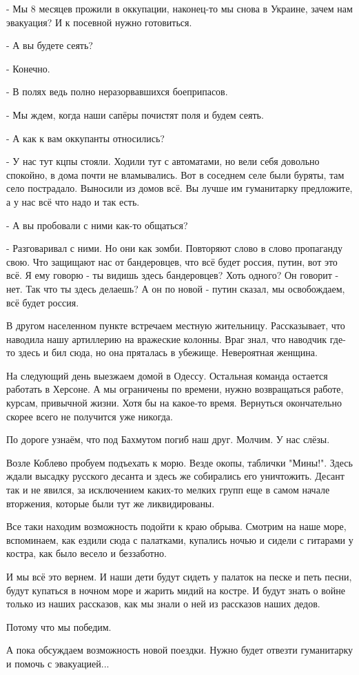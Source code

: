 - Мы 8 месяцев прожили в оккупации, наконец-то мы снова в Украине, зачем нам
эвакуация? И к посевной нужно готовиться.

- А вы будете сеять?

- Конечно.

- В полях ведь полно неразорвавшихся боеприпасов.

- Мы ждем, когда наши сапёры почистят поля и будем сеять.

- А как к вам оккупанты относились?

- У нас тут кцпы стояли. Ходили тут с автоматами, но вели себя довольно
спокойно, в дома почти не вламывались. Вот в соседнем селе были буряты, там
село пострадало. Выносили из домов всё. Вы лучше им гуманитарку предложите, а у
нас всё что надо и так есть.

- А вы пробовали с ними как-то общаться?

- Разговаривал с ними. Но они как зомби. Повторяют слово в слово пропаганду
свою. Что защищают нас от бандеровцев, что всё будет россия, путин, вот это
всё. Я ему говорю - ты видишь здесь бандеровцев? Хоть одного? Он говорит - нет.
Так что ты здесь делаешь? А он по новой - путин сказал, мы освобождаем, всё
будет россия.

В другом населенном пункте встречаем местную жительницу. Рассказывает, что
наводила нашу артиллерию на вражеские колонны. Враг знал, что наводчик где-то
здесь и бил сюда, но она пряталась в убежище. Невероятная женщина.

На следующий день выезжаем домой в Одессу. Остальная команда остается работать
в Херсоне. А мы ограничены по времени, нужно возвращаться работе, курсам,
привычной жизни. Хотя бы на какое-то время. Вернуться окончательно скорее всего
не получится уже никогда.

По дороге узнаём, что под Бахмутом погиб наш друг. Молчим. У нас слёзы.

Возле Коблево пробуем подъехать к морю. Везде окопы, таблички "Мины!". Здесь
ждали высадку русского десанта и здесь же собирались его уничтожить. Десант так
и не явился, за исключением каких-то мелких групп еще в самом начале вторжения,
которые были тут же ликвидированы. 

Все таки находим возможность подойти к краю обрыва. Смотрим на наше море,
вспоминаем, как ездили сюда с палатками, купались ночью и сидели с гитарами у
костра, как было весело и беззаботно.

И мы всё это вернем. И наши дети будут сидеть у палаток на песке и петь песни,
будут купаться в ночном море и жарить мидий на костре. И будут знать о войне
только из наших рассказов, как мы знали о ней из рассказов наших дедов.

Потому что мы победим.

А пока обсуждаем возможность новой поездки. Нужно будет отвезти гуманитарку и
помочь с эвакуацией...

